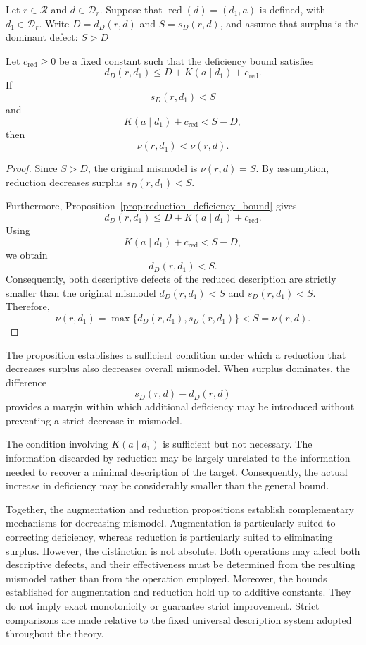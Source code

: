 \begin{proposition}
\label{prop:reduction_decreases_mismodel}
Let $r\in\mathcal R$ and $d\in\mathcal D_r$. Suppose that $\operatorname{red}(d)=(d_1,a)$ is defined, with $d_1\in\mathcal D_r$. Write $D=d_D(r,d)$ and $S=s_D(r,d)$, and assume that surplus is the dominant defect: $S>D$

Let $c_{\operatorname{red}}\geq 0$ be a fixed constant
such that the deficiency bound satisfies
\[
d_D(r,d_1) \leq D+K(a\mid d_1)+c_{\operatorname{red}}.
\]
If
\[
s_D(r,d_1)<S
\]
and
\[
K(a\mid d_1)+c_{\operatorname{red}}<S-D,
\]
then
\[
\nu(r,d_1)<\nu(r,d).
\]
\end{proposition}
\begin{proof}
Since $S>D$, the original mismodel is $\nu(r,d)=S$. By assumption, reduction decreases surplus $s_D(r,d_1)<S$.

Furthermore, Proposition~\ref{prop:reduction_deficiency_bound} gives
\[
d_D(r,d_1) \leq D+K(a\mid d_1)+c_{\operatorname{red}}.
\]
Using
\[
K(a\mid d_1)+c_{\operatorname{red}}<S-D,
\]
we obtain
\[
d_D(r,d_1)<S.
\]
Consequently, both descriptive defects of the reduced description are strictly smaller than the original mismodel $d_D(r,d_1)<S$ and $s_D(r,d_1)<S$. Therefore,
\[
\nu(r,d_1) = \max\{d_D(r,d_1),s_D(r,d_1)\} < S = \nu(r,d).
\]
\end{proof}

The proposition establishes a sufficient condition under which a reduction that decreases surplus also decreases
overall mismodel. When surplus dominates, the difference
\[
s_D(r,d)-d_D(r,d)
\]
provides a margin within which additional deficiency may be introduced without preventing a strict decrease in mismodel.

The condition involving $K(a\mid d_1)$ is sufficient but not necessary. The information discarded by reduction may be largely unrelated to the information needed to recover a minimal description of the target. Consequently, the actual increase in deficiency may be considerably smaller than the general bound.

Together, the augmentation and reduction propositions establish complementary mechanisms for decreasing mismodel. Augmentation is particularly suited to correcting deficiency, whereas reduction is particularly suited to eliminating surplus. However, the distinction is not absolute. Both operations may affect both descriptive defects, and their effectiveness must be determined from the resulting mismodel rather than from the operation employed. Moreover, the bounds established for augmentation and reduction hold up to additive constants. They do not imply exact monotonicity or guarantee strict improvement. Strict comparisons are made relative to the fixed universal description system adopted throughout the theory.

